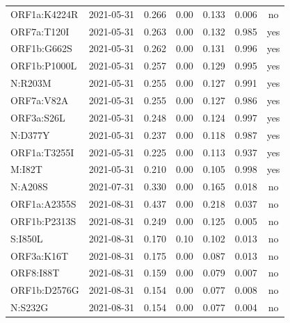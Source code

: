\begin{longtable}{lrrrrrc}
ORF1a:K4224R & 2021-05-31 & 0.266 & 0.00 & 0.133 & 0.006 & no\\
ORF7a:T120I & 2021-05-31 & 0.263 & 0.00 & 0.132 & 0.985 & yes\\
ORF1b:G662S & 2021-05-31 & 0.262 & 0.00 & 0.131 & 0.996 & yes\\
ORF1b:P1000L & 2021-05-31 & 0.257 & 0.00 & 0.129 & 0.995 & yes\\
N:R203M & 2021-05-31 & 0.255 & 0.00 & 0.127 & 0.991 & yes\\
ORF7a:V82A & 2021-05-31 & 0.255 & 0.00 & 0.127 & 0.986 & yes\\
ORF3a:S26L & 2021-05-31 & 0.248 & 0.00 & 0.124 & 0.997 & yes\\
N:D377Y & 2021-05-31 & 0.237 & 0.00 & 0.118 & 0.987 & yes\\
ORF1a:T3255I & 2021-05-31 & 0.225 & 0.00 & 0.113 & 0.937 & yes\\
M:I82T & 2021-05-31 & 0.210 & 0.00 & 0.105 & 0.998 & yes\\
N:A208S & 2021-07-31 & 0.330 & 0.00 & 0.165 & 0.018 & no\\
ORF1a:A2355S & 2021-08-31 & 0.437 & 0.00 & 0.218 & 0.037 & no\\
ORF1b:P2313S & 2021-08-31 & 0.249 & 0.00 & 0.125 & 0.005 & no\\
S:I850L & 2021-08-31 & 0.170 & 0.10 & 0.102 & 0.013 & no\\
ORF3a:K16T & 2021-08-31 & 0.175 & 0.00 & 0.087 & 0.013 & no\\
ORF8:I88T & 2021-08-31 & 0.159 & 0.00 & 0.079 & 0.007 & no\\
ORF1b:D2576G & 2021-08-31 & 0.154 & 0.00 & 0.077 & 0.008 & no\\
N:S232G & 2021-08-31 & 0.154 & 0.00 & 0.077 & 0.004 & no\\
\bottomrule
\end{longtable}